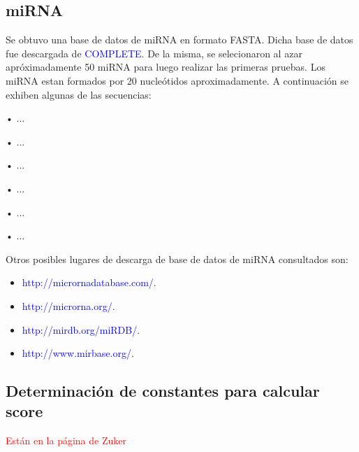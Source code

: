 \documentclass[12pt,a4paper,spanish]{article}
\begin{document}
	\subsection{miRNA}
		\par Se obtuvo una base de datos de miRNA en formato FASTA. Dicha base de datos fue descargada de
		\textcolor{blue}{COMPLETE}. De la misma, se selecionaron al azar apróximadamente 50 miRNA para luego realizar las 			primeras pruebas. Los miRNA estan formados por 20 nucleótidos aproximadamente. A continuación se exhiben algunas 			de las secuencias: 
			\par \hspace*{0.75cm} • \textsc{...}
			\par \hspace*{0.75cm} • \textsc{...}
			\par \hspace*{0.75cm} • \textsc{...}
			\par \hspace*{0.75cm} • \textsc{...}
			\par \hspace*{0.75cm} • \textsc{...}
			\par \hspace*{0.75cm} • \textsc{...}
		\par Otros posibles lugares de descarga de base de datos de miRNA consultados son: 
		\begin{itemize}
			\item \textcolor{blue}{http://micrornadatabase.com/}.
			\item \textcolor{blue}{http://microrna.org/}.	
			\item \textcolor{blue}{http://mirdb.org/miRDB/}.
			\item \textcolor{blue}{http://www.mirbase.org/}.
		\end{itemize}

	\subsection{Determinación de constantes para calcular score}
		\textcolor{red}{Están en la página de Zuker}

%
%
\end{document}
